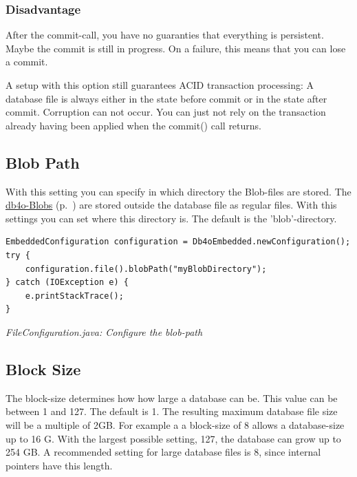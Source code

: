 \subsubsection*{Disadvantage}

After the commit-call, you have no guaranties that everything is persistent. Maybe the commit is still in progress. On a failure, this means that you can lose a commit.

A setup with this option still guarantees ACID transaction processing: A database file is always either in the state before commit or in the state after commit. Corruption can not occur. You can just not rely on the transaction already having been applied when the commit() call returns.

\subsection{Blob Path}
\label{ref:configuration-file-blob-path}

With this setting you can specify in which directory the Blob-files are stored. The \hyperref[ref:advanced-topics-type-handling-blobs]{db4o-Blobs} (p.~\pageref{ref:advanced-topics-type-handling-blobs}) are stored outside the database file as regular files. With this settings you can set where this directory is. The default is the 'blob'-directory.

\begin{lstlisting}
EmbeddedConfiguration configuration = Db4oEmbedded.newConfiguration();
try {
    configuration.file().blobPath("myBlobDirectory");
} catch (IOException e) {
    e.printStackTrace();
}
\end{lstlisting}

{\small\itshape FileConfiguration.java: Configure the blob-path\par}
\medskip

\subsection{Block Size}
\label{ref:configuration-file-block-size}

The block-size determines how how large a database can be. This value can be between 1 and 127. The default is 1. The resulting maximum database file size will be a multiple of 2GB. For example a a block-size of 8 allows a database-size up to 16 G. With the largest possible setting, 127, the database can grow up to 254 GB. A recommended setting for large database files is 8, since internal pointers have this length.

